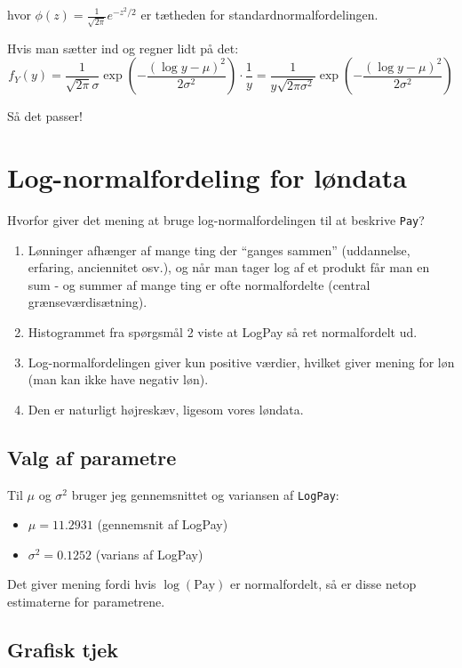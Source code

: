 \documentclass[11pt,a4paper]{article}
\begin{document}
hvor $\phi(z) = \frac{1}{\sqrt{2\pi}}e^{-z^2/2}$ er tætheden for standardnormalfordelingen.

Hvis man sætter ind og regner lidt på det:
\[
f_Y(y) = \frac{1}{\sqrt{2\pi}\sigma} \exp\left(-\frac{(\log y - \mu)^2}{2\sigma^2}\right) \cdot \frac{1}{y} = \frac{1}{y\sqrt{2\pi\sigma^2}} \exp\left(-\frac{(\log y - \mu)^2}{2\sigma^2}\right)
\]

Så det passer!

\section{Log-normalfordeling for løndata}

Hvorfor giver det mening at bruge log-normalfordelingen til at beskrive \texttt{Pay}?

\begin{enumerate}
    \item Lønninger afhænger af mange ting der ``ganges sammen'' (uddannelse, erfaring, anciennitet osv.), og når man tager log af et produkt får man en sum - og summer af mange ting er ofte normalfordelte (central grænseværdisætning).

    \item Histogrammet fra spørgsmål 2 viste at LogPay så ret normalfordelt ud.

    \item Log-normalfordelingen giver kun positive værdier, hvilket giver mening for løn (man kan ikke have negativ løn).

    \item Den er naturligt højreskæv, ligesom vores løndata.
\end{enumerate}

\subsection{Valg af parametre}

Til $\mu$ og $\sigma^2$ bruger jeg gennemsnittet og variansen af \texttt{LogPay}:
\begin{itemize}
    \item $\mu = 11.2931$ (gennemsnit af LogPay)
    \item $\sigma^2 = 0.1252$ (varians af LogPay)
\end{itemize}

Det giver mening fordi hvis $\log(\text{Pay})$ er normalfordelt, så er disse netop estimaterne for parametrene.

\subsection{Grafisk tjek}
\end{document}
